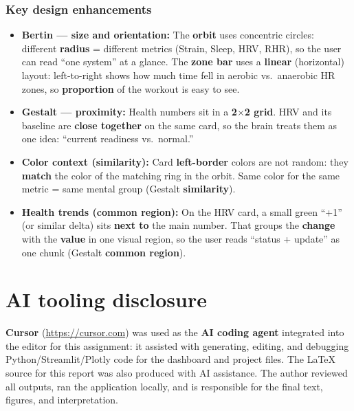 \documentclass[11pt,a4paper]{article}
\begin{document}
\subsubsection*{Key design enhancements}
\begin{itemize}[leftmargin=*]
  \item \textbf{Bertin --- size and orientation:} The \textbf{orbit} uses concentric circles: different \textbf{radius} = different metrics (Strain, Sleep, HRV, RHR), so the user can read ``one system'' at a glance. The \textbf{zone bar} uses a \textbf{linear} (horizontal) layout: left-to-right shows how much time fell in aerobic vs.\ anaerobic HR zones, so \textbf{proportion} of the workout is easy to see.
  \item \textbf{Gestalt --- proximity:} Health numbers sit in a \textbf{2$\times$2 grid}. HRV and its baseline are \textbf{close together} on the same card, so the brain treats them as one idea: ``current readiness vs.\ normal.''
  \item \textbf{Color context (similarity):} Card \textbf{left-border} colors are not random: they \textbf{match} the color of the matching ring in the orbit. Same color for the same metric = same mental group (Gestalt \textbf{similarity}).
  \item \textbf{Health trends (common region):} On the HRV card, a small green ``+1'' (or similar delta) sits \textbf{next to} the main number. That groups the \textbf{change} with the \textbf{value} in one visual region, so the user reads ``status + update'' as one chunk (Gestalt \textbf{common region}).
\end{itemize}

\section*{AI tooling disclosure}

\noindent
\textbf{Cursor} (\url{https://cursor.com}) was used as the \textbf{AI coding agent} integrated into the editor for this assignment: it assisted with generating, editing, and debugging Python/Streamlit/Plotly code for the dashboard and project files. The \LaTeX{} source for this report was also produced with AI assistance. The author reviewed all outputs, ran the application locally, and is responsible for the final text, figures, and interpretation.
\end{document}
